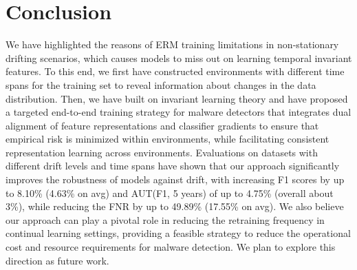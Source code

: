 \section{Conclusion}
We have highlighted the reasons of ERM training limitations in non-stationary drifting scenarios, which causes models to miss out on learning temporal invariant features. To this end,  we first have constructed environments with different time spans for the training set to reveal information about changes in the data distribution. Then, we have built on invariant learning theory and have proposed a targeted end-to-end training strategy for malware detectors that integrates dual alignment of feature representations and classifier gradients to ensure that empirical risk is minimized within environments, while facilitating consistent representation learning across environments. 
Evaluations on datasets with different drift levels and time spans have shown that our approach significantly improves the robustness of models against drift, with increasing F1 scores by up to 8.10\% (4.63\% on avg) and AUT(F1, 5 years) of up to 4.75\% (overall about 3\%), while reducing the FNR by up to 49.89\% (17.55\% on avg). We also believe our approach can play a pivotal role in reducing the retraining frequency in continual learning settings, providing a feasible strategy to reduce the operational cost and resource requirements for malware detection. We plan to explore this direction as future work.